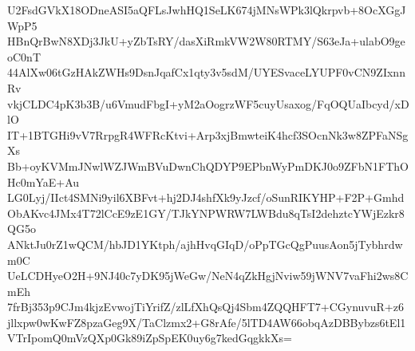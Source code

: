 U2FsdGVkX18ODneASI5aQFLsJwhHQ1SeLK674jMNsWPk3lQkrpvb+8OcXGgJWpP5
HBnQrBwN8XDj3JkU+yZbTsRY/dasXiRmkVW2W80RTMY/S63eJa+ulabO9geoC0nT
44AlXw06tGzHAkZWHs9DsnJqafCx1qty3v5sdM/UYESvaceLYUPF0vCN9ZIxnnRv
vkjCLDC4pK3b3B/u6VmudFbgI+yM2aOogrzWF5cuyUsaxog/FqOQUaIbcyd/xDlO
IT+1BTGHi9vV7RrpgR4WFRcKtvi+Arp3xjBmwteiK4hcf3SOcnNk3w8ZPFaNSgXs
Bb+oyKVMmJNwlWZJWmBVuDwnChQDYP9EPbnWyPmDKJ0o9ZFbN1FThOHc0mYaE+Au
LG0Lyj/IIct4SMNi9yil6XBFvt+hj2DJ4shfXk9yJzcf/oSunRIKYHP+F2P+Gmhd
ObAKvc4JMx4T72lCcE9zE1GY/TJkYNPWRW7LWBdu8qTsI2dehztcYWjEzkr8QG5o
ANktJu0rZ1wQCM/hbJD1YKtph/ajhHvqGIqD/oPpTGcQgPuusAon5jTybhrdwm0C
UeLCDHyeO2H+9NJ40c7yDK95jWeGw/NeN4qZkHgjNviw59jWNV7vaFhi2ws8CmEh
7frBj353p9CJm4kjzEvwojTiYrifZ/zlLfXhQsQj4Sbm4ZQQHFT7+CGynuvuR+z6
jllxpw0wKwFZ8pzaGeg9X/TaClzmx2+G8rAfe/5lTD4AW66obqAzDBBybzs6tEl1
VTrIpomQ0mVzQXp0Gk89iZpSpEK0uy6g7kedGqgkkXs=
